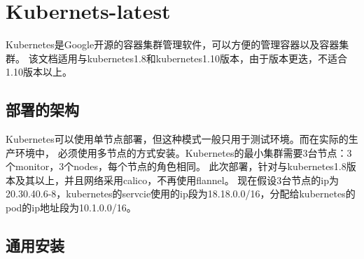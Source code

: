 \chapter{Kubernets-latest}
Kubernetes是Google开源的容器集群管理软件，可以方便的管理容器以及容器集群。
该文档适用与kubernetes1.8和kubernetes1.10版本，由于版本更迭，不适合1.10版本以上。

\section{部署的架构}
Kubernetes可以使用单节点部署，但这种模式一般只用于测试环境。而在实际的生产环境中，
必须使用多节点的方式安装。Kubernetes的最小集群需要3台节点：3个monitor，3个nodes，每个节点的角色相同。
此次部署，针对与kubernetes1.8版本及其以上，并且网络采用calico，不再使用flannel。
现在假设3台节点的ip为20.30.40.6-8，kubernetes的servcie使用的ip段为18.18.0.0/16，分配给kubernetes的
pod的ip地址段为10.1.0.0/16。

\section{通用安装}

